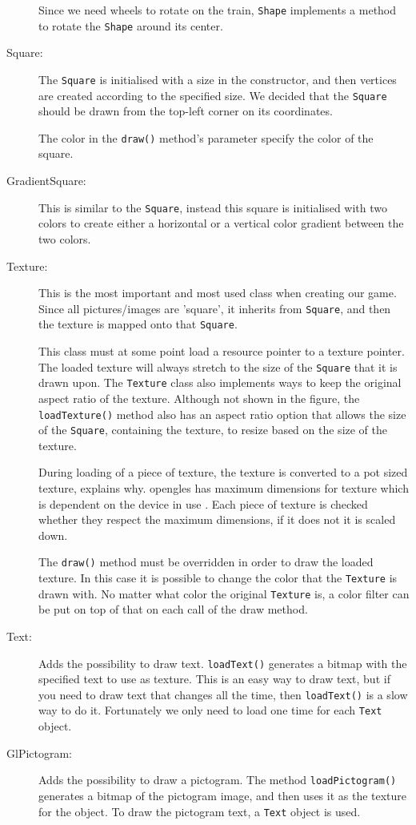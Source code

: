 \begin{description}
Since we need wheels to rotate on the train, \lstinline|Shape| implements a method to rotate the \lstinline|Shape| around its center.

\item[Square:] The \lstinline|Square| is initialised with a size in the constructor, and then vertices are created according to the specified size. We decided that the \lstinline|Square| should be drawn from the top-left corner on its coordinates.

The color in the \lstinline|draw()| method's parameter specify the color of the square.

\item[GradientSquare:] This is similar to the \lstinline|Square|, instead this square is initialised with two colors to create either a horizontal or a vertical color gradient between the two colors.

\item[Texture:] This is the most important and most used class when creating our game. Since all pictures/images are 'square', it inherits from \lstinline|Square|, and then the texture is mapped onto that \lstinline|Square|.

This class must at some point load a resource pointer to a texture pointer. The loaded texture will always stretch to the size of the \lstinline|Square| that it is drawn upon. The \lstinline|Texture| class also implements ways to keep the original aspect ratio of the texture. Although not shown in the figure, the \lstinline|loadTexture()| method also has an aspect ratio option that allows the size of the \lstinline|Square|, containing the texture, to resize based on the size of the texture.

During loading of a piece of texture, the texture is converted to a \ac{pot} sized texture,  explains why. \ac{opengles} has maximum dimensions for texture which is dependent on the device in use \citep{glutils}. Each piece of texture is checked whether they respect the maximum dimensions, if it does not it is scaled down.

The \lstinline|draw()| method must be overridden in order to draw the loaded texture. In this case it is possible to change the color that the \lstinline|Texture| is drawn with. No matter what color the original \lstinline|Texture| is, a color filter can be put on top of that on each call of the draw method.

\item[Text:] Adds the possibility to draw text. \lstinline|loadText()| generates a bitmap with the specified text to use as texture. This is an easy way to draw text, but if you need to draw text that changes all the time, then \lstinline|loadText()| is a slow way to do it. Fortunately we only need to load one time for each \lstinline|Text| object.

\item[GlPictogram:] Adds the possibility to draw a pictogram. The method \lstinline|loadPictogram()| generates a bitmap of the pictogram image, and then uses it as the texture for the object. To draw the pictogram text, a \lstinline|Text| object is used.
\end{description}

